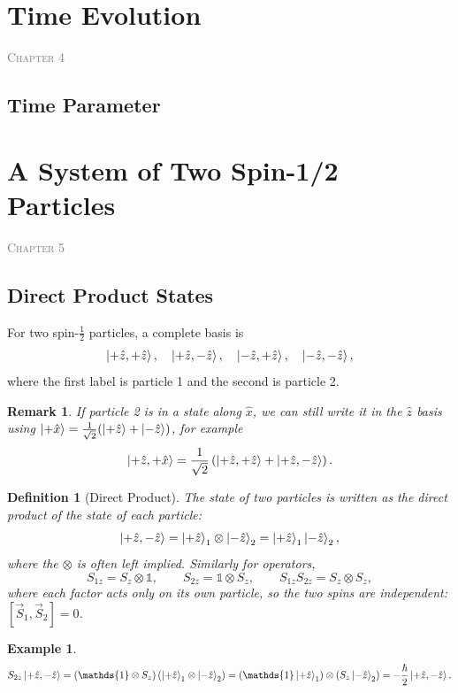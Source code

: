 \documentclass{article}
\newtheorem{definition}{Definition}
\newtheorem*{example}{Example}
\newtheorem{remark}{Remark}
\newcommand{\id}{\mathds{1}}
\newcommand{\chapterstart}[1]{\noindent\hfill{\small\scshape\textcolor{gray}{Chapter #1}}\par}
\begin{document}
\section{Time Evolution}
\chapterstart{4}
\subsection{Time Parameter}


\section{A System of Two Spin-1/2 Particles}
\marginpar{}
\chapterstart{5}
\subsection{Direct Product States}
For two spin-$\frac{1}{2}$ particles, a complete basis is
\begin{equation*}
    \ket{+\hat{z},+\hat{z}}, \quad \ket{+\hat{z},-\hat{z}}, \quad \ket{-\hat{z},+\hat{z}}, \quad \ket{-\hat{z},-\hat{z}},
\end{equation*}
where the first label is particle 1 and the second is particle 2.
\begin{remark}
    If particle 2 is in a state along $\hat{x}$, we can still write it in the $\hat{z}$ basis using $\ket{+\hat{x}} = \frac{1}{\sqrt{2}}(\ket{+\hat{z}} + \ket{-\hat{z}})$, for example
    \begin{equation*}
        \ket{+\hat{z},+\hat{x}} = \frac{1}{\sqrt{2}}\left(\ket{+\hat{z},+\hat{z}} + \ket{+\hat{z},-\hat{z}}\right).
    \end{equation*}
\end{remark}
\begin{definition}[Direct Product]
    The state of two particles is written as the direct product of the state of each particle:
    \begin{equation}
        \ket{+\hat{z},-\hat{z}} = \ket{+\hat{z}}_1 \otimes \ket{-\hat{z}}_2 = \ket{+\hat{z}}_1\ket{-\hat{z}}_2,
    \end{equation}
    where the $\otimes$ is often left implied. Similarly for operators,
    \begin{equation}
        S_{1z} = S_z \otimes \id, \qquad S_{2z} = \id \otimes S_z, \qquad S_{1z}S_{2z} = S_z \otimes S_z,
    \end{equation}
    where each factor acts only on its own particle, so the two spins are independent: $[\vec{S}_1, \vec{S}_2] = 0$.
\end{definition}
\begin{example}
    \[S_{2z}\ket{+\hat{z},-\hat{z}} = (\id \otimes S_z)\left(\ket{+\hat{z}}_1 \otimes \ket{-\hat{z}}_2\right) = \left(\id\ket{+\hat{z}}_1\right) \otimes \left(S_z\ket{-\hat{z}}_2\right) = -\frac{\hbar}{2}\ket{+\hat{z},-\hat{z}}.\]
\end{example}
\end{document}
